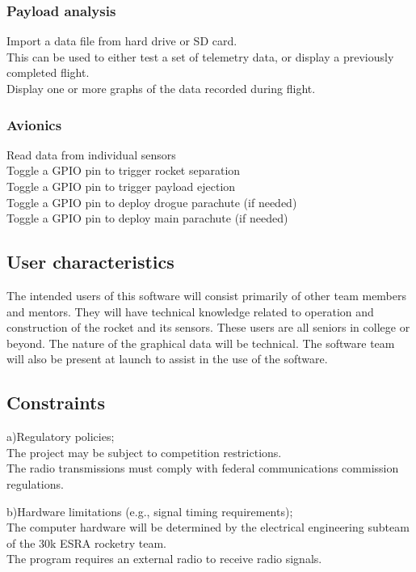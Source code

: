 \documentclass[onecolumn, draftclsnofoot, 10pt, compsoc]{IEEEtran}
\begin{document}
\subsubsection{Payload analysis}
Import a data file from hard drive or SD card.\\
This can be used to either test a set of telemetry data, or display a previously completed flight.\\
Display one or more graphs of the data recorded during flight.

\subsubsection{Avionics}
Read data from individual sensors\\
Toggle a GPIO pin to trigger rocket separation\\
Toggle a GPIO pin to trigger payload ejection\\
Toggle a GPIO pin to deploy drogue parachute (if needed)\\
Toggle a GPIO pin to deploy main parachute (if needed)

\subsection{User characteristics}
The intended users of this software will consist primarily of other team members and mentors. They will have technical knowledge related to operation and construction of the rocket and its sensors. These users are all seniors in college or beyond. The nature of the graphical data will be technical. The software team will also be present at launch to assist in the use of the software.

\subsection{Constraints}
a)Regulatory policies;\\
The project may be subject to competition restrictions.\\
The radio transmissions must comply with federal communications commission regulations.

b)Hardware limitations (e.g., signal timing requirements);\\
The computer hardware will be determined by the electrical engineering subteam of the 30k ESRA rocketry team.\\
The program requires an external radio to receive radio signals.
\end{document}
